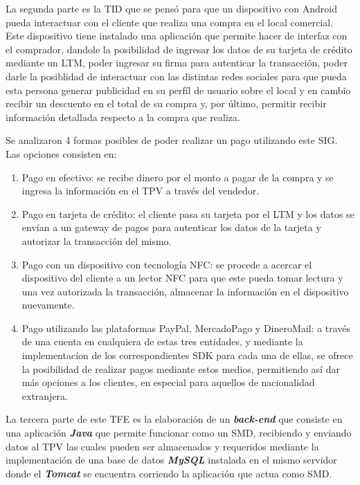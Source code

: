 La segunda parte es la \ac{TID} que se pens\'o para que un dispositivo con Android\Si{\texttrademark} pueda interactuar con el cliente que realiza una compra en el local comercial. Este dispositivo tiene instalado una aplicaci\'on que permite hacer de interfaz con el comprador, dandole la posibilidad de ingresar los datos de su tarjeta de cr\'edito mediante un \ac{LTM}, poder ingresar su firma para autenticar la transacci\'on, poder darle la posiblidad de interactuar con las distintas redes sociales para que pueda esta persona generar publicidad en su perf\'il de usuario sobre el local y en cambio recibir un descuento en el total de su compra y, por \'ultimo, permitir recibir informaci\'on detallada respecto a la compra que realiza.

Se analizaron 4 formas posibles de poder realizar un pago utilizando este \ac{SIG}. Las opciones consisten en:

\begin{enumerate}
\item Pago en efectivo: se recibe dinero por el monto a pagar de la compra y se ingresa la informaci\'on en el \ac{TPV} a trav\'es del vendedor.
\item Pago en tarjeta de cr\'edito: el cliente pasa su tarjeta por el \ac{LTM} y los datos se env\'ian a un gateway de pagos para autenticar los datos de la tarjeta y autorizar la transacci\'on del mismo.
\item Pago con un dispositivo con tecnolog\'ia \ac{NFC}: se procede a acercar el dispositivo del cliente a un lector \ac{NFC} para que este pueda tomar lectura y una vez autorizada la transacci\'on, almacenar la informaci\'on en el dispositivo nuevamente.
\item Pago utilizando las plataformas PayPal\Si{\texttrademark}, MercadoPago\Si{\texttrademark} y DineroMail\Si{\texttrademark}: a trav\'es de una cuenta en cualquiera de estas tres entidades, y mediante la implementac\'ion de los correspondientes \ac{SDK} para cada una de ellas, se ofrece la posibilidad de realizar pagos mediante estos medios, permitiendo as\'i dar m\'as opciones a los clientes, en especial para aquellos de nacionalidad extranjera.
\end{enumerate}

La tercera parte de este \ac{TFE} es la elaboraci\'on de un \textbf{\textit{back-end}} que consiste en una aplicaci\'on \textbf{\textit{Java}} que permite funcionar como un \ac{SMD}, recibiendo y enviando datos al \ac{TPV} las cuales pueden ser almacenados y requeridos mediante la implementaci\'on de una base de datos \textbf{\textit{MySQL}} instalada en el mismo servidor donde el \textbf{\textit{Tomcat}} se encuentra corriendo la aplicaci\'on que actua como \ac{SMD}.

